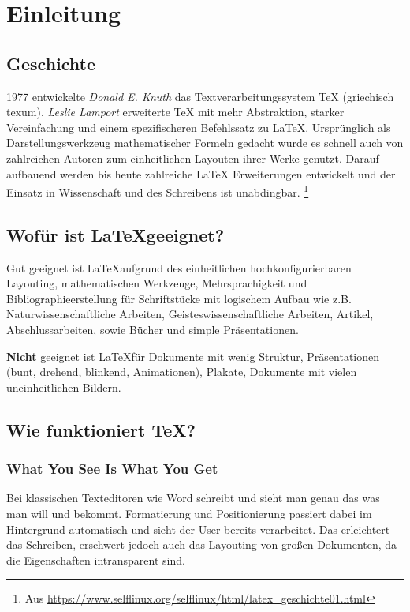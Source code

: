 \section{Einleitung}

\subsection{Geschichte}
1977 entwickelte \textit{Donald E. Knuth} das Textverarbeitungssystem TeX (griechisch texum). \textit{Leslie Lamport} erweiterte TeX mit mehr Abstraktion, starker Vereinfachung und einem spezifischeren Befehlssatz zu LaTeX. Ursprünglich als Darstellungswerkzeug mathematischer Formeln gedacht wurde es schnell auch von zahlreichen Autoren zum einheitlichen Layouten ihrer Werke genutzt.
Darauf aufbauend werden bis heute zahlreiche LaTeX Erweiterungen entwickelt und der Einsatz in Wissenschaft und des Schreibens ist unabdingbar.
\footnote{Aus \url{https://www.selflinux.org/selflinux/html/latex_geschichte01.html}}

\subsection{Wofür ist \LaTeX geeignet?}
Gut geeignet ist \LaTeX aufgrund des einheitlichen hochkonfigurierbaren Layouting,  mathematischen Werkzeuge, Mehrsprachigkeit und Bibliographieerstellung für Schriftstücke mit logischem Aufbau wie z.B. Naturwissenschaftliche Arbeiten, Geisteswissenschaftliche Arbeiten, Artikel, Abschlussarbeiten, sowie Bücher und simple Präsentationen.

\textbf{Nicht} geeignet ist \LaTeX für Dokumente mit wenig Struktur, Präsentationen (bunt, drehend, blinkend, Animationen), Plakate, Dokumente mit vielen uneinheitlichen Bildern.

\subsection{Wie funktioniert \TeX?}

\subsubsection{What You See Is What You Get}
Bei klassischen Texteditoren wie Word schreibt und sieht man genau das was man will und bekommt. Formatierung und Positionierung passiert dabei im Hintergrund automatisch und sieht der User bereits verarbeitet.
Das erleichtert das Schreiben, erschwert jedoch auch das Layouting von großen Dokumenten, da die Eigenschaften intransparent sind.

